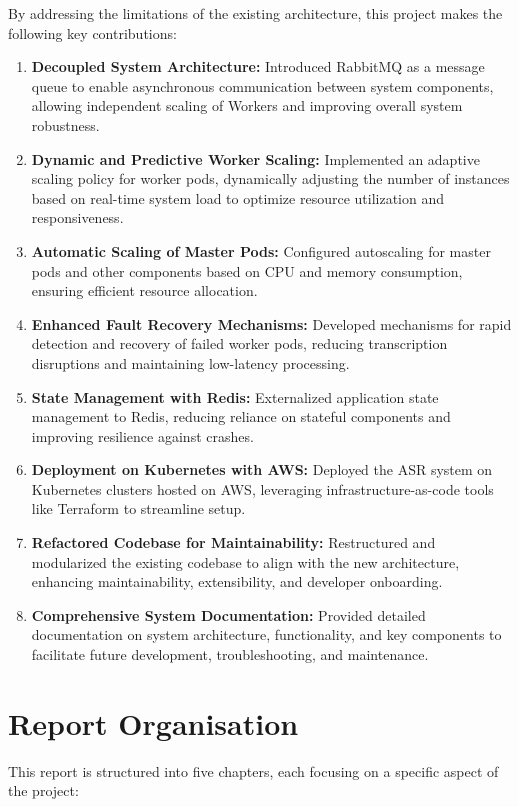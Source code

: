 By addressing the limitations of the existing architecture, this project makes the following key contributions:

\begin{enumerate}
    \item \textbf{Decoupled System Architecture:} Introduced RabbitMQ as a message queue to enable asynchronous communication between system components, allowing independent scaling of Workers and improving overall system robustness.
    
    \item \textbf{Dynamic and Predictive Worker Scaling:} Implemented an adaptive scaling policy for worker pods, dynamically adjusting the number of instances based on real-time system load to optimize resource utilization and responsiveness.

    \item \textbf{Automatic Scaling of Master Pods:} Configured autoscaling for master pods and other components based on CPU and memory consumption, ensuring efficient resource allocation.

    \item \textbf{Enhanced Fault Recovery Mechanisms:} Developed mechanisms for rapid detection and recovery of failed worker pods, reducing transcription disruptions and maintaining low-latency processing.

    \item \textbf{State Management with Redis:} Externalized application state management to Redis, reducing reliance on stateful components and improving resilience against crashes.

    \item \textbf{Deployment on Kubernetes with AWS:} Deployed the ASR system on Kubernetes clusters hosted on AWS, leveraging infrastructure-as-code tools like Terraform to streamline setup.

    \item \textbf{Refactored Codebase for Maintainability:} Restructured and modularized the existing codebase to align with the new architecture, enhancing maintainability, extensibility, and developer onboarding.

    \item \textbf{Comprehensive System Documentation:} Provided detailed documentation on system architecture, functionality, and key components to facilitate future development, troubleshooting, and maintenance.
\end{enumerate}


\section{Report Organisation}
This report is structured into five chapters, each focusing on a specific aspect of the project:


